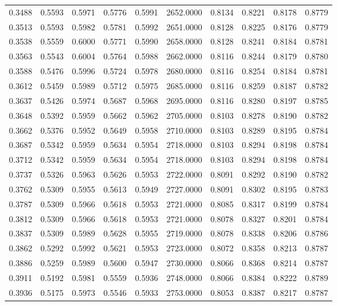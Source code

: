 \begin{tabular}{rrrrrrrrrr}
0.3488 & 0.5593 & 0.5971 & 0.5776 & 0.5991 & 2652.0000 & 0.8134 & 0.8221 & 0.8178 & 0.8779 \\
0.3513 & 0.5593 & 0.5982 & 0.5781 & 0.5992 & 2651.0000 & 0.8128 & 0.8225 & 0.8176 & 0.8779 \\
0.3538 & 0.5559 & 0.6000 & 0.5771 & 0.5990 & 2658.0000 & 0.8128 & 0.8241 & 0.8184 & 0.8781 \\
0.3563 & 0.5543 & 0.6004 & 0.5764 & 0.5988 & 2662.0000 & 0.8116 & 0.8244 & 0.8179 & 0.8780 \\
0.3588 & 0.5476 & 0.5996 & 0.5724 & 0.5978 & 2680.0000 & 0.8116 & 0.8254 & 0.8184 & 0.8781 \\
0.3612 & 0.5459 & 0.5989 & 0.5712 & 0.5975 & 2685.0000 & 0.8116 & 0.8259 & 0.8187 & 0.8782 \\
0.3637 & 0.5426 & 0.5974 & 0.5687 & 0.5968 & 2695.0000 & 0.8116 & 0.8280 & 0.8197 & 0.8785 \\
0.3648 & 0.5392 & 0.5959 & 0.5662 & 0.5962 & 2705.0000 & 0.8103 & 0.8278 & 0.8190 & 0.8782 \\
0.3662 & 0.5376 & 0.5952 & 0.5649 & 0.5958 & 2710.0000 & 0.8103 & 0.8289 & 0.8195 & 0.8784 \\
0.3687 & 0.5342 & 0.5959 & 0.5634 & 0.5954 & 2718.0000 & 0.8103 & 0.8294 & 0.8198 & 0.8784 \\
0.3712 & 0.5342 & 0.5959 & 0.5634 & 0.5954 & 2718.0000 & 0.8103 & 0.8294 & 0.8198 & 0.8784 \\
0.3737 & 0.5326 & 0.5963 & 0.5626 & 0.5953 & 2722.0000 & 0.8091 & 0.8292 & 0.8190 & 0.8782 \\
0.3762 & 0.5309 & 0.5955 & 0.5613 & 0.5949 & 2727.0000 & 0.8091 & 0.8302 & 0.8195 & 0.8783 \\
0.3787 & 0.5309 & 0.5966 & 0.5618 & 0.5953 & 2721.0000 & 0.8085 & 0.8317 & 0.8199 & 0.8784 \\
0.3812 & 0.5309 & 0.5966 & 0.5618 & 0.5953 & 2721.0000 & 0.8078 & 0.8327 & 0.8201 & 0.8784 \\
0.3837 & 0.5309 & 0.5989 & 0.5628 & 0.5955 & 2719.0000 & 0.8078 & 0.8338 & 0.8206 & 0.8786 \\
0.3862 & 0.5292 & 0.5992 & 0.5621 & 0.5953 & 2723.0000 & 0.8072 & 0.8358 & 0.8213 & 0.8787 \\
0.3886 & 0.5259 & 0.5989 & 0.5600 & 0.5947 & 2730.0000 & 0.8066 & 0.8368 & 0.8214 & 0.8787 \\
0.3911 & 0.5192 & 0.5981 & 0.5559 & 0.5936 & 2748.0000 & 0.8066 & 0.8384 & 0.8222 & 0.8789 \\
0.3936 & 0.5175 & 0.5973 & 0.5546 & 0.5933 & 2753.0000 & 0.8053 & 0.8387 & 0.8217 & 0.8787 \\

\end{tabular}
